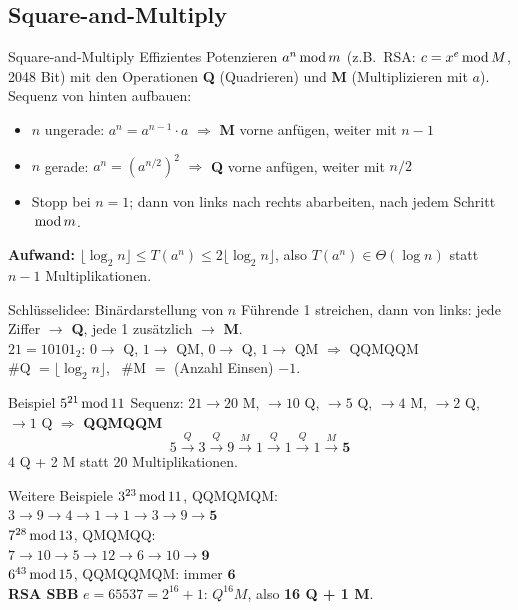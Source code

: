 \documentclass[a4paper, fontsize=7pt]{scrartcl}
\newcommand{\Mod}{\mskip3mu\mathrm{mod}\mskip3mu}
\begin{document}
\subsection{Square-and-Multiply}

\begin{mainbox}{Square-and-Multiply}
Effizientes Potenzieren $a^n \Mod m$ (z.B.\ RSA: $c = x^e \Mod M$, 2048 Bit)
mit den Operationen \textbf{Q} (Quadrieren) und \textbf{M} (Multiplizieren mit
$a$). Sequenz von hinten aufbauen:
\begin{itemize}
    \item $n$ ungerade: $a^n = a^{n-1} \cdot a$ $\Rightarrow$ \textbf{M} vorne
          anfügen, weiter mit $n - 1$
    \item $n$ gerade: $a^n = (a^{n/2})^2$ $\Rightarrow$ \textbf{Q} vorne
          anfügen, weiter mit $n / 2$
    \item Stopp bei $n = 1$; dann von links nach rechts abarbeiten,
          nach jedem Schritt $\Mod m$.
\end{itemize}
\textbf{Aufwand:}
$\lfloor\log_2 n\rfloor \le T(a^n) \le 2\lfloor\log_2 n\rfloor$,
also $\boxed{T(a^n) \in \Theta(\log n)}$ statt $n - 1$ Multiplikationen.
\end{mainbox}

\begin{subbox}{Schlüsselidee: Binärdarstellung von $n$}
Führende 1 streichen, dann von links: jede Ziffer $\to$ \textbf{Q}, jede 1
zusätzlich $\to$ \textbf{M}.\\
$21 = 10101_2$: $0 \to$ Q, $1 \to$ QM, $0 \to$ Q, $1 \to$ QM $\Rightarrow$
QQMQQM\\
\#Q $= \lfloor\log_2 n\rfloor$, \ \#M $=$ (Anzahl Einsen) $- 1$.
\end{subbox}

\begin{subbox}{Beispiel $5^{21} \Mod 11$}
Sequenz: $21 \to 20$ M, $\to 10$ Q, $\to 5$ Q, $\to 4$ M, $\to 2$ Q, $\to 1$ Q
$\Rightarrow$ \textbf{QQMQQM}
$$5 \xrightarrow{Q} 3 \xrightarrow{Q} 9 \xrightarrow{M} 1 \xrightarrow{Q} 1
\xrightarrow{Q} 1 \xrightarrow{M} \mathbf{5}$$
4 Q + 2 M statt 20 Multiplikationen.
\end{subbox}

\begin{subbox}{Weitere Beispiele}
$3^{23} \Mod 11$, QQMQMQM:\\
$3 \to 9 \to 4 \to 1 \to 1 \to 3 \to 9 \to \mathbf{5}$\\
$7^{28} \Mod 13$, QMQMQQ:\\
$7 \to 10 \to 5 \to 12 \to 6 \to 10 \to \mathbf{9}$\\
$6^{43} \Mod 15$, QQMQQMQM: immer $\mathbf{6}$\\
\textbf{RSA SBB} $e = 65537 = 2^{16} + 1$: $Q^{16}M$, also
\textbf{16 Q + 1 M}.
\end{subbox}
\end{document}
